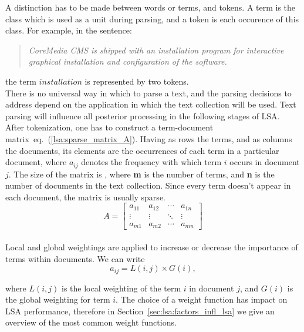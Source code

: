 A distinction has to be made between words or terms, and tokens. A term is the class which is used as a unit during parsing, and a token is each occurence of this class. For example, in the sentence: 

\begin{quote}
\textit{CoreMedia CMS is shipped with an installation program for interactive graphical installation and configuration of the software.}
\end{quote}

the term $ installation $ is represented by two tokens. \\

There is no universal way in which to parse a text, and the parsing decisions to address depend on the application in which the text collection will be used. Text parsing will influence all posterior processing in the following stages of \gls{LSA}. \\

After tokenization, one has to construct a term-document matrix~eq.~(\ref{lsa:sparse_matrix_A}). Having as rows the terms, and as columns the documents, its elements are the occurrences of each term in a particular document, where $ a_{ij} $ denotes the frequency with which term $ i $ occurs in document $ j $. The size of the matrix is , where {\bf m} is the number of terms, and {\bf n} is the number of documents in the text collection. Since every term doesn't appear in each document, the matrix is usually sparse. \\

%
%
\begin{equation}
A=
\begin{bmatrix}
\label{lsa:sparse_matrix_A}
 a_{11}& a_{12}& \cdots& a_{1n} \\
 \vdots& \vdots& \ddots& \vdots \\ 
 a_{m1}& a_{m2}& \cdots& a_{mn}
\end{bmatrix}
\end{equation}\\

Local and global weightings are applied to increase or decrease the importance of terms within documents. We can write
%
%
\begin{equation}
\label{lsa:global_local_weighting}
a_{ij}=L(i,j) \times G(i),
\end{equation}

where $L(i,j)$ is the local weighting of the term $i$ in document $j$, and $G(i)$ is the global weighting for term $i$. The choice of a weight function has impact on \gls{LSA} performance, therefore in Section~\ref{sec:lsa:factors_infl_lsa} we give an overview of the most common weight functions. \\


